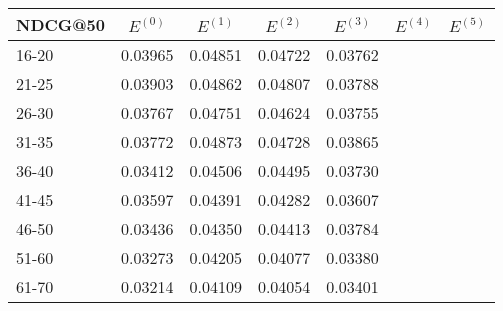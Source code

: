 \begin{table*}[]
    \centering
    \begin{tabular}{|l|l|l|l|l|l|l|}
        \hline
        NDCG@50 & \multicolumn{1}{c|}{$E^{(0)}$} & \multicolumn{1}{c|}{$E^{(1)}$} & \multicolumn{1}{c|}{$E^{(2)}$} & \multicolumn{1}{c|}{$E^{(3)}$} & \multicolumn{1}{c|}{$E^{(4)}$} & \multicolumn{1}{c|}{$E^{(5)}$} \\ \hline
        16-20   & 0.03965                        & 0.04851                        & 0.04722                        & 0.03762                        &                                &                                \\ \hline
        21-25   & 0.03903                        & 0.04862                        & 0.04807                        & 0.03788                        &                                &                                \\ \hline
        26-30   & 0.03767                        & 0.04751                        & 0.04624                        & 0.03755                        &                                &                                \\ \hline
        31-35   & 0.03772                        & 0.04873                        & 0.04728                        & 0.03865                        &                                &                                \\ \hline
        36-40   & 0.03412                        & 0.04506                        & 0.04495                        & 0.03730                        &                                &                                \\ \hline
        41-45   & 0.03597                        & 0.04391                        & 0.04282                        & 0.03607                        &                                &                                \\ \hline
        46-50   & 0.03436                        & 0.04350                        & 0.04413                        & 0.03784                        &                                &                                \\ \hline
        51-60   & 0.03273                        & 0.04205                        & 0.04077                        & 0.03380                        &                                &                                \\ \hline
        61-70   & 0.03214                        & 0.04109                        & 0.04054                        & 0.03401                        &                                &                                \\ \hline

\end{tabular}
\end{table*}
